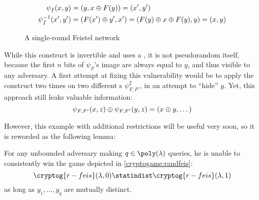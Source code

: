 \begin{align*}
    \psi_f(x, y)        &= (y, x \oplus F(y)) = (x', y')                                  \\
    \psi^{-1}_f(x', y') &= (F(x') \oplus y', x') = (F(y) \oplus x \oplus F(y), y) = (x, y)    \\
\end{align*}

\begin{figure}
    \centering

    
    \label{fig:feistel}
    \caption{A single-round Feistel network}
\end{figure}

While this construct is invertible and uses a \prf{}, it is not pseudorandom itself, because the first $n$ bits of $\psi_F$'s image are always equal to $y$, and thus visible to any adversary. A first attempt at fixing this vulnerability would be to apply the construct two times on two different \prf{}s $\psi^2_{F, F'}$, in an attempt to ``hide'' $y$. Yet, this approach still leaks valuable information:
\[
    \psi_{F, F'}(x, z) \oplus \psi_{F, F'}(y, z) = (x \oplus y, \dots)
\]

However, this example with additional restrictions will be useful very soon, so it is reworded as the following lemma:

\begin{lemma}
    For any unbounded adversary making $q \in \poly(\lambda)$ queries, he is unable to consistently win the game depicted in \ref{cryptogame:randfeis}:
    \[
        \cryptog{r-feis}(\lambda, 0) \statindist \cryptog{r-feis}(\lambda, 1)
    \]
    as long as $y_1, \ldots, y_q$ are mutually distinct.
\end{lemma}

